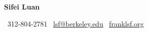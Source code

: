 \documentclass[10pt]{article}
\begin{document}
\begin{center}
  {\Huge \bfseries Sifei Luan}
\end{center}

\begin{center}
  \faPhone\, 312-804-2781
  \hfill
  \faEnvelopeO\, \href{mailto:lsf@berkeley.edu}{lsf@berkeley.edu}
  \hfill
  \faGlobe\, \href{https://franklsf.org}{franklsf.org}
\end{center}


\vspace{8pt}









\end{document}
